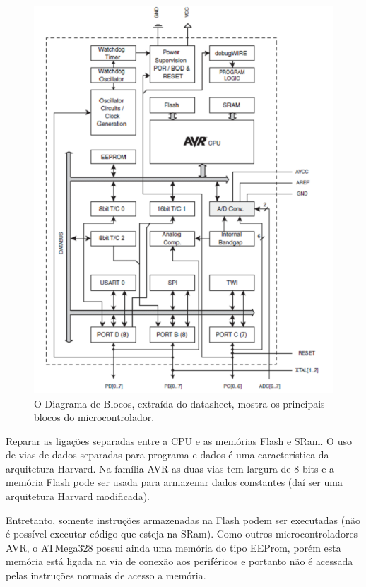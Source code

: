  \FloatBarrier
 \begin{figure} [!htp]
	\centering
	\includegraphics[scale=0.6]{figuras/atmega328}
	\caption{O Diagrama de Blocos, extraída do datasheet, mostra os principais blocos do microcontrolador.}
	\label{atmega328}
\end{figure}
\FloatBarrier

Reparar as ligações separadas entre a CPU e as memórias Flash e SRam. O uso de vias de dados separadas para programa e dados é uma característica da arquitetura Harvard. Na família AVR as duas vias tem largura de 8 bits e a memória Flash pode ser usada para armazenar dados constantes (daí ser uma arquitetura Harvard modificada). 

Entretanto, somente instruções armazenadas na Flash podem ser executadas (não é possível executar código que esteja na SRam).
Como outros microcontroladores AVR, o ATMega328 possui ainda uma memória do tipo EEProm, porém esta memória está ligada na via de conexão aos periféricos e portanto não é acessada pelas instruções normais de acesso a memória.

